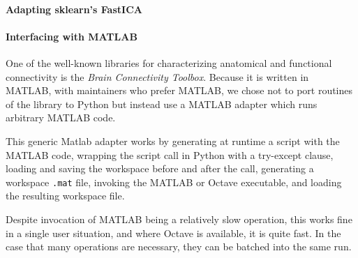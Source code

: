 \paragraph{Adapting sklearn's FastICA}


\paragraph{Interfacing with MATLAB}

One of the well-known libraries for characterizing anatomical 
and functional connectivity is the \emph{Brain Connectivity Toolbox}. 
Because it is written in MATLAB, with maintainers who prefer MATLAB, we 
chose not to port routines of the library to Python but instead use
a MATLAB adapter which runs arbitrary MATLAB code. 

This generic Matlab adapter works by generating at runtime a script with the MATLAB code, 
wrapping the script call in Python with a try-except clause,  
loading and saving the workspace before and after the call,
generating a workspace \texttt{.mat} file, invoking the MATLAB or Octave
executable, and loading the resulting workspace file. 

Despite invocation of MATLAB being a relatively slow operation, this works fine in a single
user situation, and where Octave is available, it is quite fast. In the 
case that many operations are necessary, they can be batched into the 
same run.


